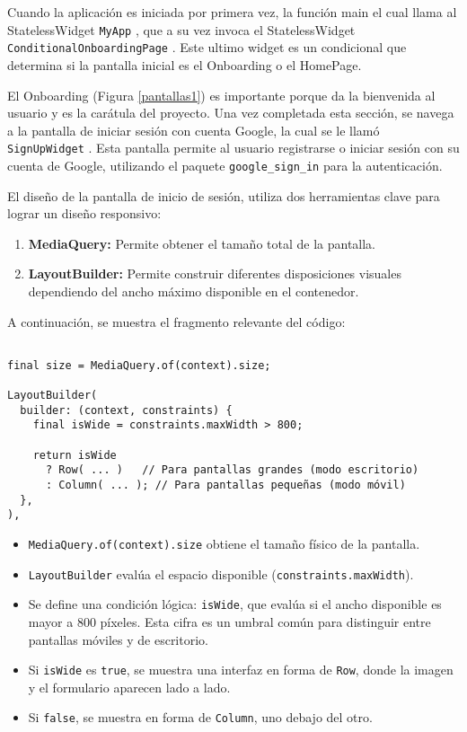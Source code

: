 Cuando la aplicación es iniciada por primera vez, la función main %
el cual llama al StatelessWidget \texttt{MyApp} 
, que a su vez invoca el StatelessWidget \texttt{ConditionalOnboardingPage} %
. Este ultimo widget es un condicional que determina si la pantalla inicial es el Onboarding %
o el HomePage. %

El Onboarding (Figura \ref{pantallas1}) es importante porque da la bienvenida al usuario y es la carátula del proyecto. Una vez completada esta sección, se navega a la pantalla de iniciar sesión con cuenta Google, la cual se le llamó \texttt{SignUpWidget} %
. Esta pantalla permite al usuario registrarse o iniciar sesión con su cuenta de Google, utilizando el paquete \texttt{google\_sign\_in} para la autenticación.

El diseño de la pantalla de inicio de sesión, %
utiliza dos herramientas clave para lograr un diseño responsivo:

\begin{enumerate}
    \item \textbf{MediaQuery:} Permite obtener el tamaño total de la pantalla.
    \item \textbf{LayoutBuilder:} Permite construir diferentes disposiciones visuales dependiendo del ancho máximo disponible en el contenedor.
\end{enumerate}

A continuación, se muestra el fragmento relevante del código:

\begin{verbatim}

final size = MediaQuery.of(context).size;

LayoutBuilder(
  builder: (context, constraints) {
    final isWide = constraints.maxWidth > 800;

    return isWide
      ? Row( ... )   // Para pantallas grandes (modo escritorio)
      : Column( ... ); // Para pantallas pequeñas (modo móvil)
  },
),
\end{verbatim}



\begin{itemize}
    \item \texttt{MediaQuery.of(context).size} obtiene el tamaño físico de la pantalla.
    \item \texttt{LayoutBuilder} evalúa el espacio disponible (\texttt{constraints.maxWidth}).
    \item Se define una condición lógica: \texttt{isWide}, que evalúa si el ancho disponible es mayor a 800 píxeles. Esta cifra es un umbral común para distinguir entre pantallas móviles y de escritorio.
    \item Si \texttt{isWide} es \texttt{true}, se muestra una interfaz en forma de \texttt{Row}, donde la imagen y el formulario aparecen lado a lado.
    \item Si \texttt{false}, se muestra en forma de \texttt{Column}, uno debajo del otro.
\end{itemize}

